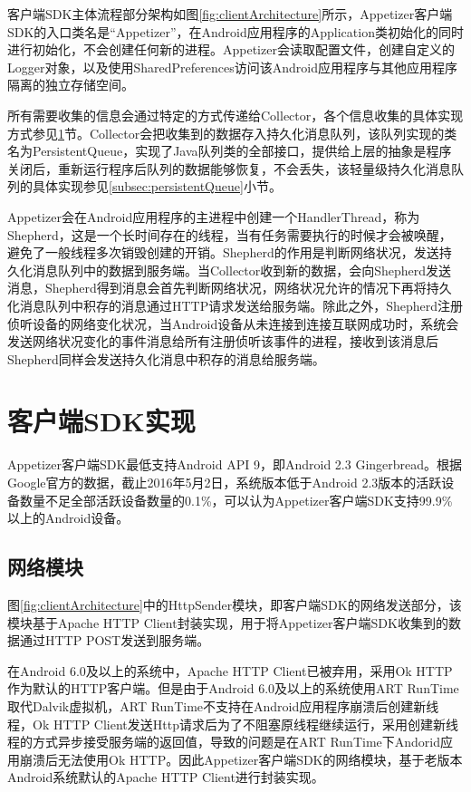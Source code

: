 客户端SDK主体流程部分架构如图\ref{fig:clientArchitecture}所示，Appetizer客户端SDK的入口类名是“Appetizer”，在Android应用程序的Application类初始化的同时进行初始化，不会创建任何新的进程。Appetizer会读取配置文件，创建自定义的Logger对象，以及使用SharedPreferences访问该Android应用程序与其他应用程序隔离的独立存储空间。

所有需要收集的信息会通过特定的方式传递给Collector，各个信息收集的具体实现方式参见\ref{sec:clientSDKimplement}节。Collector会把收集到的数据存入持久化消息队列，该队列实现的类名为PersistentQueue，实现了Java队列类的全部接口，提供给上层的抽象是程序关闭后，重新运行程序后队列的数据能够恢复，不会丢失，该轻量级持久化消息队列的具体实现参见\ref{subsec:persistentQueue}小节。

Appetizer会在Android应用程序的主进程中创建一个HandlerThread，称为Shepherd，这是一个长时间存在的线程，当有任务需要执行的时候才会被唤醒，避免了一般线程多次销毁创建的开销。Shepherd的作用是判断网络状况，发送持久化消息队列中的数据到服务端。当Collector收到新的数据，会向Shepherd发送消息，Shepherd得到消息会首先判断网络状况，网络状况允许的情况下再将持久化消息队列中积存的消息通过HTTP请求发送给服务端。除此之外，Shepherd注册侦听设备的网络变化状况，当Android设备从未连接到连接互联网成功时，系统会发送网络状况变化的事件消息给所有注册侦听该事件的进程，接收到该消息后Shepherd同样会发送持久化消息中积存的消息给服务端。

\section{客户端SDK实现}
\label{sec:clientSDKimplement}

Appetizer客户端SDK最低支持Android API 9，即Android 2.3 Gingerbread。根据Google官方的数据，截止2016年5月2日，系统版本低于Android 2.3版本的活跃设备数量不足全部活跃设备数量的0.1\%，可以认为Appetizer客户端SDK支持99.9\%以上的Android设备。

\subsection{网络模块}
\label{subsec:networkModulo}

图\ref{fig:clientArchitecture}中的HttpSender模块，即客户端SDK的网络发送部分，该模块基于Apache HTTP Client封装实现，用于将Appetizer客户端SDK收集到的数据通过HTTP POST发送到服务端。

在Android 6.0及以上的系统中，Apache HTTP Client已被弃用，采用Ok HTTP作为默认的HTTP客户端。但是由于Android 6.0及以上的系统使用ART RunTime取代Dalvik虚拟机，ART RunTime不支持在Android应用程序崩溃后创建新线程，Ok HTTP Client发送Http请求后为了不阻塞原线程继续运行，采用创建新线程的方式异步接受服务端的返回值，导致的问题是在ART RunTime下Andorid应用崩溃后无法使用Ok HTTP\parencite{create_thread}。因此Appetizer客户端SDK的网络模块，基于老版本Android系统默认的Apache HTTP Client进行封装实现。

